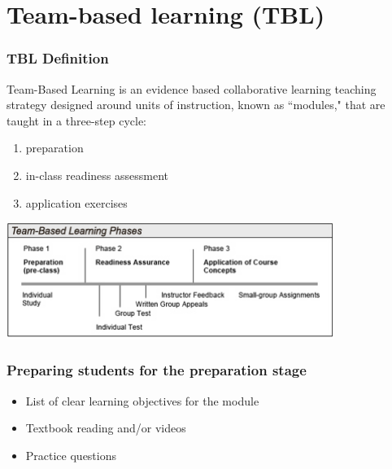 \documentclass{beamer}
\begin{document}

\section{Team-based learning (TBL)}


\begin{frame}
\frametitle{TBL Definition}

Team-Based Learning is an evidence based collaborative learning teaching strategy 
designed around units of instruction, known as ``modules," that are taught in a three-step cycle: 

\begin{enumerate}
\item preparation
\item in-class readiness assessment
\item application exercises
\end{enumerate}

\begin{center}
\includegraphics[width = 0.8\textwidth]{figures/TBLPhases}
\end{center}

\end{frame}


\begin{frame}
\frametitle{Preparing students for the preparation stage}

\begin{itemize}

\item List of clear learning objectives for the module

\item Textbook reading and/or videos

\item Practice questions

\end{itemize}

\end{frame}
\end{document}
